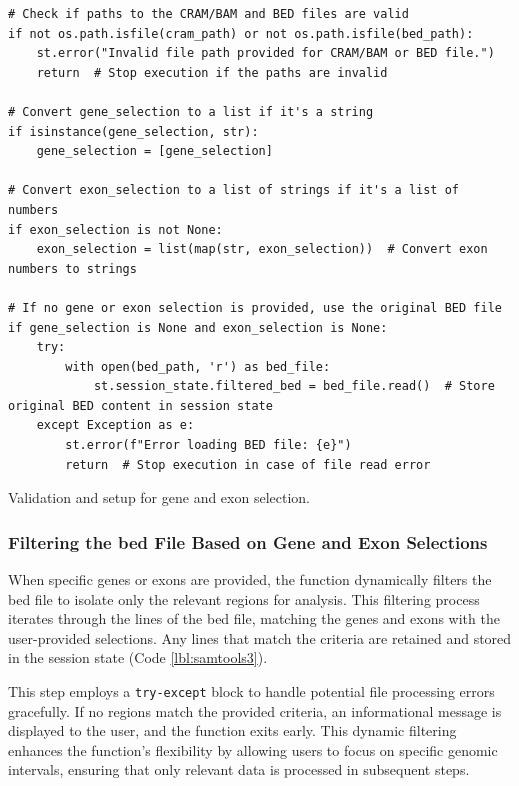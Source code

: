 \begin{longlisting}
\begin{verbatim}
# Check if paths to the CRAM/BAM and BED files are valid
if not os.path.isfile(cram_path) or not os.path.isfile(bed_path):
    st.error("Invalid file path provided for CRAM/BAM or BED file.")
    return  # Stop execution if the paths are invalid

# Convert gene_selection to a list if it's a string
if isinstance(gene_selection, str):
    gene_selection = [gene_selection]

# Convert exon_selection to a list of strings if it's a list of numbers
if exon_selection is not None:
    exon_selection = list(map(str, exon_selection))  # Convert exon numbers to strings

# If no gene or exon selection is provided, use the original BED file
if gene_selection is None and exon_selection is None:
    try:
        with open(bed_path, 'r') as bed_file:
            st.session_state.filtered_bed = bed_file.read()  # Store original BED content in session state
    except Exception as e:
        st.error(f"Error loading BED file: {e}")
        return  # Stop execution in case of file read error
\end{verbatim}
\caption{Validation and setup for gene and exon selection.}
\label{lbl:samtools2}
\end{longlisting}

\subsubsection{\textbf{Filtering the \ac{bed} File Based on Gene and Exon Selections}}

When specific genes or exons are provided, the function dynamically filters the \ac{bed} file to isolate only the relevant regions for analysis. This filtering process iterates through the lines of the \ac{bed} file, matching the genes and exons with the user-provided selections. Any lines that match the criteria are retained and stored in the session state (Code \ref{lbl:samtools3}).

This step employs a \texttt{try-except} block to handle potential file processing errors gracefully. If no regions match the provided criteria, an informational message is displayed to the user, and the function exits early. This dynamic filtering enhances the function's flexibility by allowing users to focus on specific genomic intervals, ensuring that only relevant data is processed in subsequent steps.

